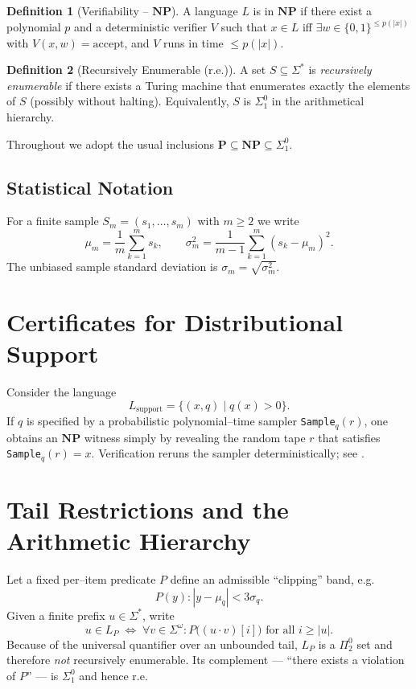 \documentclass[12pt]{article}
\theoremstyle{definition}
\newtheorem{definition}{Definition}[section]
\begin{document}
\begin{definition}[Verifiability -- $\mathbf{NP}$]
A language $L$ is in $\mathbf{NP}$ if there exist a polynomial $p$ and a deterministic verifier $V$ such that $x \in L$ iff $\exists w \in \{0,1\}^{\le p(|x|)}$ with $V(x,w)=\mathrm{accept}$, and $V$ runs in time $\le p(|x|)$.
\end{definition}

\begin{definition}[Recursively Enumerable (r.e.)]
A set $S \subseteq \Sigma^*$ is \emph{recursively enumerable} if there exists a Turing machine that enumerates exactly the elements of $S$ (possibly without halting).  Equivalently, $S$ is $\Sigma^0_1$ in the arith­metical hierarchy.
\end{definition}

Throughout we adopt the usual inclusions $\mathbf{P} \subseteq \mathbf{NP} \subseteq \Sigma^0_1$.

\subsection{Statistical Notation}
For a finite sample $S_m = (s_1,\dots,s_m)$ with $m\ge 2$ we write
\[
  \mu_m = \frac1m \sum_{k=1}^m s_k,\qquad
  \sigma_m^2 = \frac1{m-1}\sum_{k=1}^m (s_k-\mu_m)^2 .
\]
The unbiased sample standard deviation is $\sigma_m = \sqrt{\sigma_m^2}$.

\section{Certificates for Distributional Support}
\label{sec:certificates}
Consider the language
\[
  L_{\mathrm{support}} = \{(x,q)\mid q(x)>0\}.
\]
If $q$ is specified by a probabilistic polynomial--time sampler \texttt{Sample}$_q(r)$, one obtains an $\mathbf{NP}$ witness simply by revealing the random tape $r$ that satisfies \texttt{Sample}$_q(r)=x$.  Verification reruns the sampler deterministically; see \cite[Sec.~2]{goldreich2008foundations}.

\section{Tail Restrictions and the Arithmetic Hierarchy}
Let a fixed per--item predicate $P$ define an admissible ``clipping'' band, e.g.
\[
  P(y) : |y-\mu_q| < 3\sigma_q .
\]
Given a finite prefix $u \in \Sigma^*$, write
\[
  u \in L_P \;\Longleftrightarrow\; \forall v \in \Sigma^{\omega}: P\bigl((u\cdot v)[i]\bigr) \text{ for all } i\ge |u|.
\]
Because of the universal quantifier over an unbounded tail, $L_P$ is a $\Pi^0_2$ set and therefore \emph{not} recursively enumerable.  Its complement --- ``there exists a violation of $P$'' --- is $\Sigma^0_1$ and hence r.e.
\end{document}
